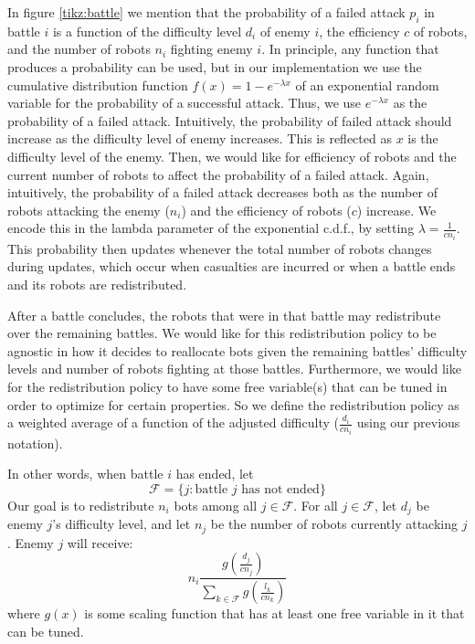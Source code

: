 \documentclass[11pt]{article}
\theoremstyle{definition}
\begin{document}
In figure \ref{tikz:battle} we mention that the probability of a failed attack
$p_i$ in battle $i$ is a function of the difficulty level $d_i$ of enemy $i$,
the efficiency $c$ of robots, and the number of robots $n_i$ fighting enemy
$i$.
%
In principle, any function that produces a probability can be used, but in our
implementation we use the cumulative distribution function
$f(x) = 1 - e^{-\lambda x}$ of an exponential random variable for the
probability of a successful attack.
%
Thus, we use $e^{-\lambda x}$ as the probability of a failed attack.
%
Intuitively, the probability of failed attack should increase as the difficulty
level of enemy increases.
This is reflected as $x$ is the difficulty level
of the enemy.
Then, we would like for efficiency of robots and the current number of robots
to affect the probability of a failed attack.
Again, intuitively, the probability of a failed attack decreases both as the
number of robots attacking the enemy ($n_i$) and the efficiency of robots ($c$)
increase.
We encode this in the lambda parameter of the exponential c.d.f., by setting
$\lambda = \frac{1}{c n_i}$.
This probability then updates whenever the total number of robots changes
during updates, which occur when casualties are incurred or when a battle ends
and its robots are redistributed.

After a battle concludes, the robots that were
in that battle may redistribute over the remaining battles.
We would like for this redistribution policy
to be agnostic in how it decides to reallocate
bots given the remaining battles' difficulty
levels and number of robots fighting at those battles.
Furthermore, we would like for the redistribution
policy to have some free variable(s) that can be
tuned in order to optimize for certain properties.
%
So we define the redistribution policy as a weighted
average of a function of the adjusted difficulty
($\frac{d_i}{c n_i}$ using our previous notation).

In other words, when battle $ i $ has ended,
let
\begin{equation*}
    \mathcal{F} = \{
        j : \text{battle } j \text{ has not ended}
    \}
\end{equation*}
%
Our goal is to redistribute $ n_i $ bots among
all $ j \in \mathcal{F} $.
%
For all $ j \in \mathcal{F} $, let $ d_j $ be enemy
$j$'s difficulty level, and let $ n_j $ be the number
of robots currently attacking $j$.
Enemy $j$ will receive:
\begin{equation*}
    n_i \frac{g(\frac{d_j}{c n_j})}{
        {\displaystyle\sum_{k \in \mathcal{F}}}
        g(\frac{l_k}{c n_k})}
\end{equation*}
%
where $g(x)$ is some scaling function that has at least one free variable in
it that can be tuned.
\end{document}

